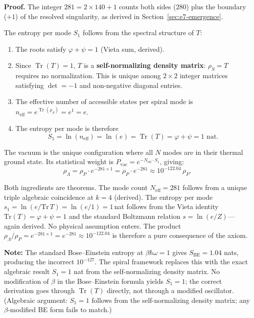 \documentclass[12pt,a4paper]{article}
\begin{document}
\textbf{Proof.} The integer $281 = 2 \times 140 + 1$ counts both sides ($280$) plus the boundary ($+1$) of the resolved singularity, as derived in Section~\ref{sec:e7-emergence}.

The entropy per mode $S_1$ follows from the spectral structure of $T$:
\begin{enumerate}
\item The roots satisfy $\varphi + \psi = 1$ (Vieta sum, derived).
\item Since $\operatorname{Tr}(T) = 1$, $T$ is a \textbf{self-normalizing density matrix}: $\rho_S = T$ requires no normalization. This is unique among $2\times 2$ integer matrices satisfying $\det = -1$ and non-negative diagonal entries.
\item The effective number of accessible states per spiral mode is $n_{\mathrm{eff}} = e^{\operatorname{Tr}(\rho_S)} = e^1 = e$.
\item The entropy per mode is therefore
\begin{equation}
S_1 = \ln(n_{\mathrm{eff}}) = \ln(e) = \operatorname{Tr}(T) = \varphi + \psi = 1 \text{ nat}.
\end{equation}
\end{enumerate}

The vacuum is the unique configuration where all $N$ modes are in their thermal ground state. Its statistical weight is $P_{\mathrm{vac}} = e^{-N_{\mathrm{eff}} \cdot S_1}$, giving:
\begin{equation}
\rho_\Lambda = \rho_P \cdot e^{-281 \times 1} = \rho_P \cdot e^{-281} \approx 10^{-122.04}\,\rho_P.
\end{equation}

Both ingredients are theorems. The mode count $N_{\mathrm{eff}} = 281$ follows from a unique triple algebraic coincidence at $k=4$ (derived). The entropy per mode $s_1 = \ln(e/\mathrm{Tr}\,T) = \ln(e/1) = 1$\,nat follows from the Vieta identity $\mathrm{Tr}(T) = \varphi + \psi = 1$ and the standard Boltzmann relation $s = \ln(e/Z)$---again derived.  No physical assumption enters. The product $\rho_\Lambda/\rho_P = e^{-281 \times 1} = e^{-281} \approx 10^{-122.04}$ is therefore a pure consequence of the axiom.

\textbf{Note:} The standard Bose--Einstein entropy at $\beta\hbar\omega = 1$ gives $S_{\mathrm{BE}} = 1.04$ nats, producing the incorrect $10^{-127}$. The spiral framework replaces this with the exact algebraic result $S_1 = 1$ nat from the self-normalizing density matrix. No modification of $\beta$ in the Bose--Einstein formula yields $S_1 = 1$; the correct derivation goes through $\operatorname{Tr}(T)$ directly, not through a modified oscillator. (Algebraic argument: $S_1 = 1$ follows from the self-normalizing density matrix; any $\beta$-modified BE form fails to match.)
\end{document}
